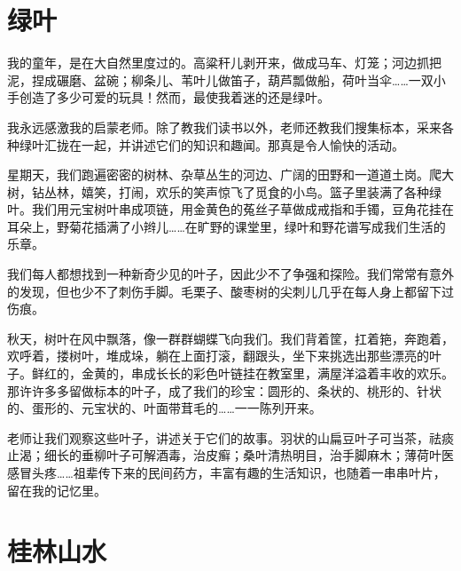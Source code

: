 \documentclass[12pt,UTF-8,openany]{ctexbook}
\begin{document}
\chapter{绿叶}

\begin{large}
    
    我的童年，是在大自然里度过的。高粱秆儿剥开来，做成马车、灯笼；河边抓把泥，捏成碾磨、盆碗；柳条儿、苇叶儿做笛子，葫芦瓢做船，荷叶当伞……一双小手创造了多少可爱的玩具！然而，最使我着迷的还是绿叶。
    
    我永远感激我的启蒙老师。除了教我们读书以外，老师还教我们搜集标本，采来各种绿叶汇拢在一起，并讲述它们的知识和趣闻。那真是令人愉快的活动。
    
    星期天，我们跑遍密密的树林、杂草丛生的河边、广阔的田野和一道道土岗。爬大树，钻丛林，嬉笑，打闹，欢乐的笑声惊飞了觅食的小鸟。篮子里装满了各种绿叶。我们用元宝树叶串成项链，用金黄色的菟丝子草做成戒指和手镯，豆角花挂在耳朵上，野菊花插满了小辫儿……在旷野的课堂里，绿叶和野花谱写成我们生活的乐章。
    
    我们每人都想找到一种新奇少见的叶子，因此少不了争强和探险。我们常常有意外的发现，但也少不了刺伤手脚。毛栗子、酸枣树的尖刺儿几乎在每人身上都留下过伤痕。
    
    秋天，树叶在风中飘落，像一群群蝴蝶飞向我们。我们背着筐，扛着筢，奔跑着，欢呼着，搂树叶，堆成垛，躺在上面打滚，翻跟头，坐下来挑选出那些漂亮的叶子。鲜红的，金黄的，串成长长的彩色叶链挂在教室里，满屋洋溢着丰收的欢乐。那许许多多留做标本的叶子，成了我们的珍宝：圆形的、条状的、桃形的、针状的、蛋形的、元宝状的、叶面带茸毛的……一一陈列开来。
    
    老师让我们观察这些叶子，讲述关于它们的故事。羽状的山扁豆叶子可当茶，祛痰止渴；细长的垂柳叶子可解酒毒，治皮癣；桑叶清热明目，治手脚麻木；薄荷叶医感冒头疼……祖辈传下来的民间药方，丰富有趣的生活知识，也随着一串串叶片，留在我的记忆里。
    
\end{large}



\chapter{桂林山水}
\end{document}

